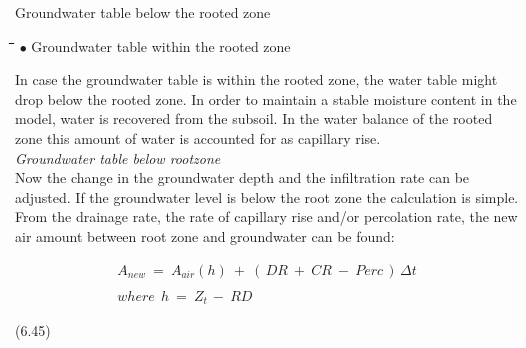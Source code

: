 \documentclass[11pt]{article}
\begin{document}
\begin{indenting}{1.27cm}
Groundwater table below the rooted zone
\end{indenting}
\begin{tabbing}
\hspace{1.27cm}\=\hspace{1.27cm}\=\hspace{1.27cm}\=\hspace{1.27cm}\=%
\hspace{1.27cm}\=\hspace{1.27cm}\=\hspace{1.27cm}\=\hspace{1.27cm}\=%
\hspace{1.27cm}\=\hspace{1.27cm}\=\kill
$\bullet$\> Groundwater table within the rooted zone
\end{tabbing}
In case the groundwater table is within the rooted zone, the water table might drop below
the rooted zone. In order to maintain a stable moisture content in the model, water is
recovered from the subsoil. In the water balance of the rooted zone this amount of water
is accounted for as capillary rise.\\
 {\it Groundwater table below rootzone\/}\\
Now the change in the groundwater depth and the infiltration rate can be adjusted. If the
groundwater level is below the root zone the calculation is simple. From the drainage
rate, the rate of capillary rise and/or percolation rate, the new air amount between root
zone and groundwater can be found:

\begin{eqnarray*}
 A _{new} ~=~ A _{air} (h) ~+~ (\, DR ~+~ CR ~-~ Perc\, )\, \Delta t  \nonumber  \\
\, \nonumber  \\
where~~ h~=~Z _{t~} -~ RD
\end{eqnarray*}

 \bigskip
\strut\hfill (6.45)
\end{document}
